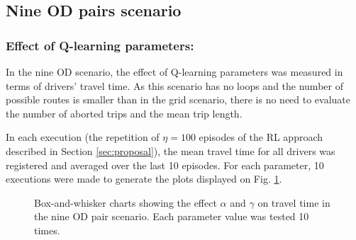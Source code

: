 \documentclass{RITA}
\newcommand{\numepis}{\ensuremath{\eta}}	%
\begin{document}
\subsection{Nine OD pairs scenario}

\subsubsection{Effect of Q-learning parameters:}
\label{sec:qlParamsNineOD}
In the nine OD scenario, the effect of Q-learning parameters was measured in terms of drivers' travel time. As this scenario has no loops and the number of possible routes is smaller than in the grid scenario, there is no need to evaluate the number of aborted trips and the mean trip length.

In each execution (the repetition of $\numepis = 100$ episodes of the RL approach described in Section \ref{sec:proposal}), the mean travel time for all drivers was registered and averaged over the last 10 episodes.  For each parameter, 10 executions were made to generate the plots displayed on Fig. \ref{fig:qLearningParams}.

\begin{figure}
  \centering
  \caption{Box-and-whisker charts showing the effect $\alpha$ and $\gamma$ on travel time in the nine OD pair scenario. Each parameter value was tested 10 times.}
  \label{fig:qLearningParams}
\end{figure}
\end{document}
